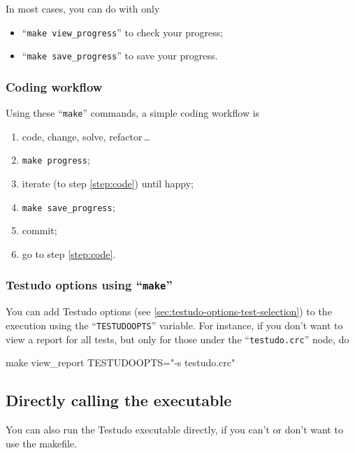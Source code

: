 \documentclass[twoside, a4paper, article]{memoir}
\newcommand*\ellipsis{\,\ldots}
\begin{document}
In most cases, you can do with only
\begin{itemize}
\item ``\texttt{make view\_progress}'' to check your progress;
\item ``\texttt{make save\_progress}'' to save your progress.
\end{itemize}

\subsubsection{Coding workflow}
\label{sec:coding-workflow}

Using these ``\texttt{make}'' commands, a simple coding workflow is
\begin{enumerate}
\item\label{step:code} code, change, solve, refactor\ellipsis{}
\item \texttt{make progress};
\item iterate (to step \ref{step:code}) until happy;
\item \texttt{make save\_progress};
\item commit;
\item go to step \ref{step:code}.
\end{enumerate}

\subsubsection{Testudo options using ``\texttt{make}''}
\label{sec:testudo-options-using-make}

You can add Testudo options (see \ref{sec:testudo-options-test-selection}) to
the execution using the ``\texttt{TESTUDOOPTS}'' variable.  For instance, if
you don't want to view a report for all tests, but only for those under the
``\texttt{testudo.crc}'' node, do
\begin{bashlisting}
make view_report TESTUDOOPTS="-s testudo.crc"
\end{bashlisting}


\subsection{Directly calling the executable}
\label{sec:directly-calling-executable}

You can also run the Testudo executable directly, if you can't or don't want to
use the makefile.
\end{document}
